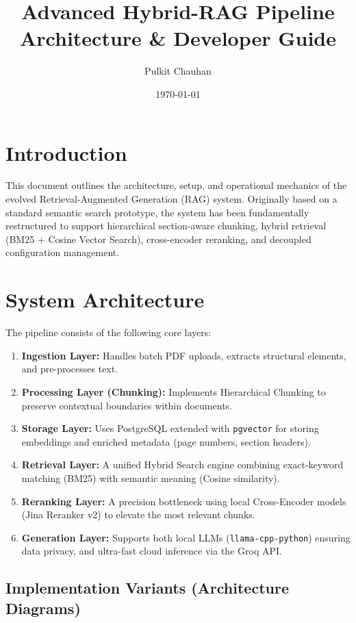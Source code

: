 \documentclass[11pt, a4paper]{article}
\title{\textbf{Advanced Hybrid-RAG Pipeline Architecture \& Developer Guide}}
\author{Pulkit Chauhan}
\date{\today}
\begin{document}
\maketitle

\tableofcontents
\newpage

\section{Introduction}
This document outlines the architecture, setup, and operational mechanics of the evolved Retrieval-Augmented Generation (RAG) system. Originally based on a standard semantic search prototype, the system has been fundamentally restructured to support hierarchical section-aware chunking, hybrid retrieval (BM25 + Cosine Vector Search), cross-encoder reranking, and decoupled configuration management.

\section{System Architecture}

The pipeline consists of the following core layers:
\begin{enumerate}
    \item \textbf{Ingestion Layer:} Handles batch PDF uploads, extracts structural elements, and pre-processes text.
    \item \textbf{Processing Layer (Chunking):} Implements Hierarchical Chunking to preserve contextual boundaries within documents.
    \item \textbf{Storage Layer:} Uses PostgreSQL extended with \texttt{pgvector} for storing embeddings and enriched metadata (page numbers, section headers).
    \item \textbf{Retrieval Layer:} A unified Hybrid Search engine combining exact-keyword matching (BM25) with semantic meaning (Cosine similarity).
    \item \textbf{Reranking Layer:} A precision bottleneck using local Cross-Encoder models (Jina Reranker v2) to elevate the most relevant chunks.
    \item \textbf{Generation Layer:} Supports both local LLMs (\texttt{llama-cpp-python}) ensuring data privacy, and ultra-fast cloud inference via the Groq API.
\end{enumerate}

\subsection{Implementation Variants (Architecture Diagrams)}
\end{document}
